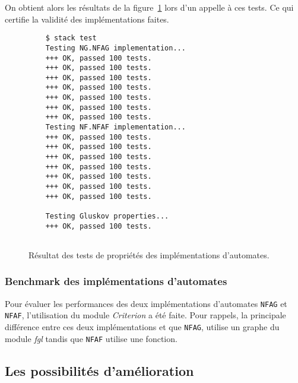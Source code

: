 \vphantom{}

On obtient alors les résultats de la figure~\ref{fig:resTest} lors d'un appelle 
à ces tests. Ce qui certifie la validité des implémentations faites.

\begin{figure}[H]
  \begin{verbatim}
    $ stack test
    Testing NG.NFAG implementation...
    +++ OK, passed 100 tests.
    +++ OK, passed 100 tests.
    +++ OK, passed 100 tests.
    +++ OK, passed 100 tests.
    +++ OK, passed 100 tests.
    +++ OK, passed 100 tests.
    +++ OK, passed 100 tests.
    Testing NF.NFAF implementation...
    +++ OK, passed 100 tests.
    +++ OK, passed 100 tests.
    +++ OK, passed 100 tests.
    +++ OK, passed 100 tests.
    +++ OK, passed 100 tests.
    +++ OK, passed 100 tests.
    +++ OK, passed 100 tests.
    
    Testing Gluskov properties...
    +++ OK, passed 100 tests.
    
  \end{verbatim}
  \caption{Résultat des tests de propriétés des implémentations d'automates.}
  \label{fig:resTest}
\end{figure}

\subsubsection{Benchmark des implémentations d'automates}

Pour évaluer les performances des deux implémentations d'automates 
\texttt{NFAG} et \texttt{NFAF}, l'utilisation du 
module \textit{Criterion} a été faite. Pour rappels, la principale différence 
entre ces deux implémentations et que \texttt{NFAG}, utilise un 
graphe du module \textit{fgl} tandis que \texttt{NFAF} utilise une
fonction.

\vphantom{}



\subsection{Les possibilités d'amélioration}
